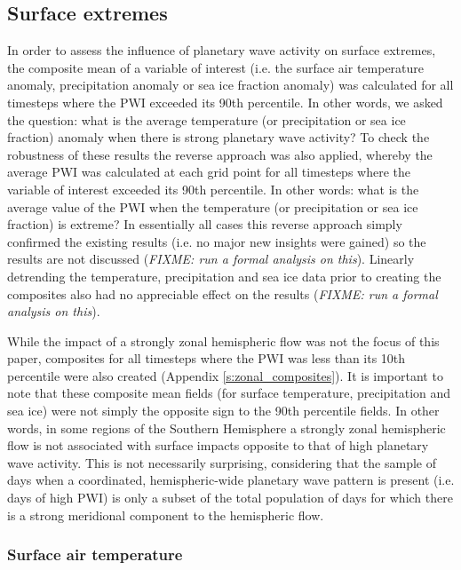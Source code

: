 \subsection{Surface extremes}

In order to assess the influence of planetary wave activity on surface extremes, the composite mean of a variable of interest (i.e. the surface air temperature anomaly, precipitation anomaly or sea ice fraction anomaly) was calculated for all timesteps where the PWI exceeded its 90th percentile. In other words, we asked the question: what is the average temperature (or precipitation or sea ice fraction) anomaly when there is strong planetary wave activity? To check the robustness of these results the reverse approach was also applied, whereby the average PWI was calculated at each grid point for all timesteps where the variable of interest exceeded its 90th percentile. In other words: what is the average value of the PWI when the temperature (or precipitation or sea ice fraction) is extreme? In essentially all cases this reverse approach simply confirmed the existing results (i.e. no major new insights were gained) so the results are not discussed (\textit{FIXME: run a formal analysis on this}). Linearly detrending the temperature, precipitation and sea ice data prior to creating the composites also had no appreciable effect on the results (\textit{FIXME: run a formal analysis on this}).

While the impact of a strongly zonal hemispheric flow was not the focus of this paper, composites for all timesteps where the PWI was less than its 10th percentile were also created (Appendix \ref{s:zonal_composites}). It is important to note that these composite mean fields (for surface temperature, precipitation and sea ice) were not simply the opposite sign to the 90th percentile fields. In other words, in some regions of the Southern Hemisphere a strongly zonal hemispheric flow is not associated with surface impacts opposite to that of high planetary wave activity. This is not necessarily surprising, considering that the sample of days when a coordinated, hemispheric-wide planetary wave pattern is present (i.e. days of high PWI) is only a subset of the total population of days for which there is a strong meridional component to the hemispheric flow.

\subsubsection{Surface air temperature}

